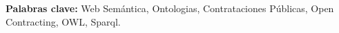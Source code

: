 \begin{resumen}


    
\textbf{Palabras clave:} Web Semántica,  Ontologias, Contrataciones Públicas, Open Contracting, OWL, Sparql.
\end{resumen}


